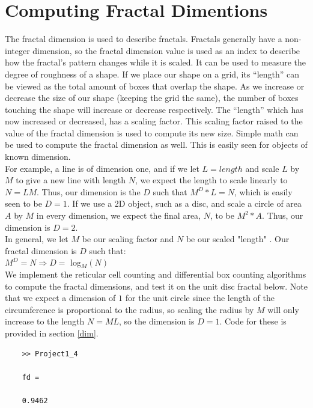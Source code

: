 \documentclass[12pt]{article}
\begin{document}
\section{Computing Fractal Dimentions}
The fractal dimension is used to describe fractals. Fractals generally have a non-integer dimension, so the fractal dimension value is used as an index to describe how the fractal’s pattern changes while it is scaled. It can be used to measure the degree of roughness of a shape. If we place our shape on a grid, its “length” can be viewed as the total amount of boxes that overlap the shape. As we increase or decrease the size of our shape (keeping the grid the same), the number of boxes touching the shape will increase or decrease respectively. The “length” which has now increased or decreased, has a scaling factor. This scaling factor raised to the value of the fractal dimension is used to compute its new size. Simple math can be used to compute the fractal dimension as well. This is easily seen for objects of known dimension.\\
For example, a line is of dimension one, and if we let $L=length$ and scale $L$ by $M$ to give a new line with length $N$, we expect the length to scale linearly to $N=LM$. Thus, our dimension is the $D$ such that $M^D*L=N$, which is easily seen to be $D=1$. If we use a 2D object, such as a disc, and scale a circle of area $A$ by $M$ in every dimension, we expect the final area, $N$, to be $M^2*A$. Thus, our dimension is $D=2$.\\ 

In general, we let $M$ be our scaling factor and $N$ be our scaled "length" . Our fractal dimension is $D$ such that:  \\
$M^{D} = N \Rightarrow D =$ log$_{M}(N)$\\
\newline
We implement the reticular cell counting and differential box counting algorithms to compute the fractal dimensions, and test it on the unit disc fractal below. Note that we expect a dimension of $1$ for the unit circle since the length of the circumference is proportional to the radius, so scaling the radius by $M$ will only increase to the length $N=ML$, so the dimension is $D=1$. Code for these is provided in section \ref{dim}.

	\begin{verbatim}
	>> Project1_4
	
	fd =
	
	0.9462
	\end{verbatim}
\end{document}
